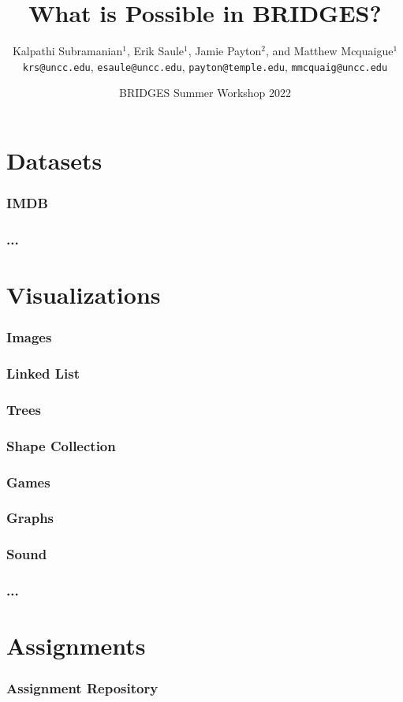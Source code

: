 \documentclass[aspectratio=169]{beamer}
\title{What is Possible in BRIDGES?}
\subtitle{}
\author{Kalpathi Subramanian$^1$, Erik Saule$^1$, Jamie Payton$^2$, and Matthew Mcquaigue$^1$ \\\texttt{krs@uncc.edu}, \texttt{esaule@uncc.edu}, \texttt{payton@temple.edu}, \texttt{mmcquaig@uncc.edu}}
\institute{$^1$The University of North Carolina at Charlotte\\$^2$Temple University}
\date{BRIDGES Summer Workshop 2022}
\begin{document}
\begin{frame}
\titlepage
\end{frame}



\section{Datasets}

\begin{frame}
  \frametitle{IMDB}
\end{frame}

\begin{frame}
  \frametitle{...}
\end{frame}

\section{Visualizations}

\begin{frame}
  \frametitle{Images}
\end{frame}

\begin{frame}
  \frametitle{Linked List}
\end{frame}

\begin{frame}
  \frametitle{Trees}
\end{frame}

\begin{frame}
  \frametitle{Shape Collection}
\end{frame}

\begin{frame}
  \frametitle{Games}
\end{frame}

\begin{frame}
  \frametitle{Graphs}
\end{frame}

\begin{frame}
  \frametitle{Sound}
\end{frame}

\begin{frame}
  \frametitle{...}
\end{frame}

\section{Assignments}

\begin{frame}
  \frametitle{Assignment Repository}
\end{frame}
\end{document}
